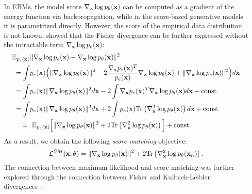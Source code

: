 In EBMs, the model score $\nabla_{{\mathbf{x}}}\log p_{\theta}({\mathbf{x}})$ can be computed as a gradient of the energy function via backpropagation, while in the score-based generative models it is parametrized directly. However, the score of the empirical data distribution is not known. 
\citet{hyvarinen2005estimation} showed that the Fisher divergence can be further expressed without the intractable term $\nabla_{{\mathbf{x}}} \log p_{e}({\mathbf{x}})$: 
\begin{align}
\E_{p_{e}(\rvx)}&\|\nabla_{\rvx} \log p_{e}(\rvx) - \nabla_{\rvx}\log p_{\theta}(\rvx)\|^2 \notag \\
 = \int& p_e(\rvx) \Big(\|\nabla_{\rvx}\log p_{\theta}(\rvx)\|^2 - 2 \frac{\nabla_{\rvx}p_{e}(\rvx)^T}{p_{e}(\rvx)} \nabla_{\rvx}\log p_{\theta}(\rvx)  + \|\nabla_{\rvx} \log p_{e}(\rvx)\|^2 \Big)d\rvx \notag \\
= \int& p_e(\rvx) \|\nabla_{\rvx}\log p_{\theta}(\rvx)\|^2d\rvx 
    - 2 \int \nabla_{\rvx}p_{e}(\rvx)^T \nabla_{\rvx}\log p_{\theta}(\rvx)d\rvx  + \text{const}  \label{eq:sm_2}\\
= \int & p_e(\rvx) \|\nabla_{\rvx}\log p_{\theta}(\rvx)\|^2d\rvx 
    + 2 \int p_{e}(\rvx) \text{Tr}\left(\nabla^2_{\rvx}\log p_{\theta}(\rvx)\right)d\rvx  + \text{const} \label{eq:sm_3} \\
= \,\,&\,\,\E_{p_e(\rvx)} \Big[ \|\nabla_{\rvx}\log p_{\theta}(\rvx)\|^2 
    + 2 \text{Tr}\left(\nabla^2_{\rvx}\log p_{\theta}(\rvx)\right)\Big]  + \text{const}. \label{eq:sm_4}     
\end{align}
As a result, we obtain the following \textit{score matching} objective:
\begin{equation}\label{eq:score_matching}
\begin{aligned}
\mathcal{L}^{SM}(\rvx, \theta)   =  \|\nabla_{\rvx}\log p_{\theta}(\rvx)\|^2 + 2\text{Tr}\left(\nabla^2_{\rvx}\log p_{\theta}(\rvx_n)\right).
\end{aligned}
\end{equation}
The connection between maximum likelihood and score matching was further explored through the connection between Fisher and Kulback-Leibler divergences~\cite{lyu2009interpretation}.

